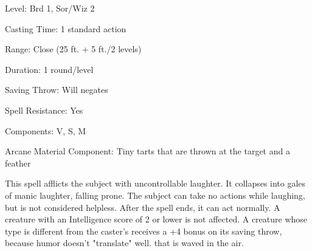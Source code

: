 
\begin{description*}
\item[Level:] Brd 1, Sor/Wiz 2
\item[Casting Time:] 1 standard action
\item[Range:] Close (25 ft. + 5 ft./2 levels)
\item[Duration:] 1 round/level
\item[Saving Throw:] Will negates
\item[Spell Resistance:] Yes
\item[Components:] V, S, M
\item[Arcane Material Component:] Tiny tarts that are thrown at the target and a feather
\end{description*}

This spell afflicts the subject with uncontrollable laughter. It collapses into
gales of manic laughter, falling prone. The subject can take no actions while laughing,
but is not considered helpless. After the spell ends, it can act normally.
A creature with an Intelligence score of 2 or lower is not affected. A creature
whose type is different from the caster's receives a +4 bonus on its saving throw,
because humor doesn't "translate" well.
that is waved in the air.